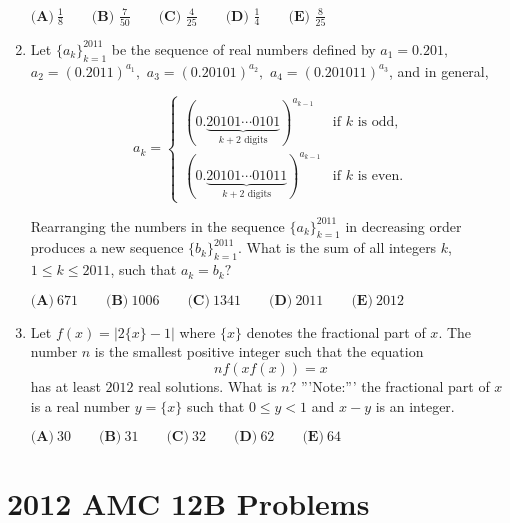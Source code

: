 \documentclass{article}
\begin{document}
\begin{enumerate}[label=\arabic*., itemsep=0.5em]
\( \textbf{(A)}\ \frac{1}{8}\qquad\textbf{(B) }\frac{7}{50}\qquad\textbf{(C) }\frac{4}{25}\qquad\textbf{(D) }\frac{1}{4}\qquad\textbf{(E) }\frac{8}{25} \)\par \vspace{0.5em}\item Let \(\{a_k\}_{k=1}^{2011}\) be the sequence of real numbers defined by \(a_1=0.201,\) \(a_2=(0.2011)^{a_1},\) \(a_3=(0.20101)^{a_2},\) \(a_4=(0.201011)^{a_3}\), and in general, 


\begin{equation*}
a_k=\begin{cases}
(0.\underbrace{20101\cdots 0101}_{k+2\text{ digits}})^{a_{k-1}} & \text{if }k\text{ is odd,}\\
(0.\underbrace{20101\cdots 01011}_{k+2\text{ digits}})^{a_{k-1}}& \text{if }k\text{ is even.}
\end{cases}
\end{equation*}


Rearranging the numbers in the sequence  \(\{a_k\}_{k=1}^{2011}\) in decreasing order produces a new sequence  \(\{b_k\}_{k=1}^{2011}\).  What is the sum of all integers \(k\), \(1\le k \le 2011\), such that \(a_k=b_k?\)

\( \textbf{(A)}\ 671\qquad\textbf{(B)}\ 1006\qquad\textbf{(C)}\ 1341\qquad\textbf{(D)}\ 2011\qquad\textbf{(E)}\ 2012 \)\par \vspace{0.5em}\item Let \(f(x)=|2\{x\}-1|\) where \(\{x\}\) denotes the fractional part of \(x\).  The number \(n\) is the smallest positive integer such that the equation 
\begin{equation*}
nf(xf(x))=x
\end{equation*}
 has at least \(2012\) real solutions.  What is \(n\)?  '''Note:''' the fractional part of \(x\) is a real number \(y=\{x\}\) such that \(0\le y<1\) and \(x-y\) is an integer.

\( \textbf{(A)}\ 30\qquad\textbf{(B)}\ 31\qquad\textbf{(C)}\ 32\qquad\textbf{(D)}\ 62\qquad\textbf{(E)}\ 64 \)\par \vspace{0.5em}\end{enumerate}\newpage\section*{2012 AMC 12B Problems}
\end{document}
